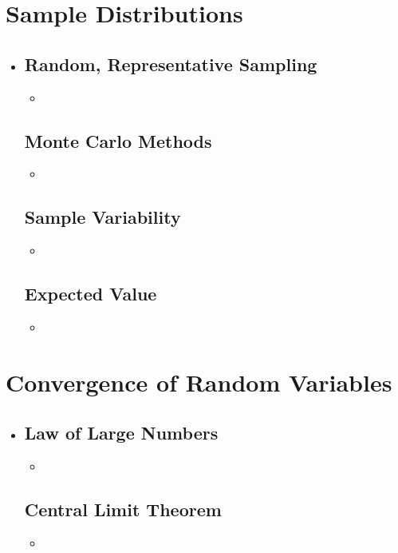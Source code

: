\section{Sample Distributions}
\begin{itemize}
  \item[]
  
  \subsection{Random, Representative Sampling}
  \begin{itemize}
    \item 
  \end{itemize}

  \subsection{Monte Carlo Methods}
  \begin{itemize}
    \item 
  \end{itemize}
  
  \subsection{Sample Variability}
  \begin{itemize}
    \item 
  \end{itemize}

  \subsection{Expected Value}
  \begin{itemize}
    \item 
  \end{itemize}
  
\end{itemize}

\section{Convergence of Random Variables}
\begin{itemize}
  \item[]
  
  \subsection{Law of Large Numbers}
  \begin{itemize}
    \item 
  \end{itemize}

  \subsection{Central Limit Theorem}
  \begin{itemize}
    \item 
  \end{itemize}
  
\end{itemize}
